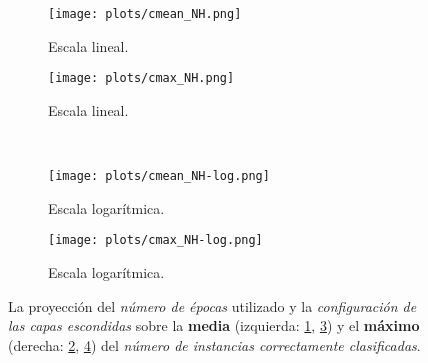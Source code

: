 \begin{figure}[h]
	\centering
	\begin{subfigure}[b]{0.49\textwidth}
        \texttt{[image: plots/cmean\_NH.png]}
        \caption{Escala lineal.}
        \label{fig:cmean_NH-lin}
    \end{subfigure}
	\begin{subfigure}[b]{0.49\textwidth}
        \texttt{[image: plots/cmax\_NH.png]}
        \caption{Escala lineal.}
        \label{fig:cmax_NH-lin}
    \end{subfigure}
    \\
	\begin{subfigure}[b]{0.49\textwidth}
        \texttt{[image: plots/cmean\_NH-log.png]}
        \caption{Escala logarítmica.}
        \label{fig:cmean_NH-log}
    \end{subfigure}
	\begin{subfigure}[b]{0.49\textwidth}
        \texttt{[image: plots/cmax\_NH-log.png]}
        \caption{Escala logarítmica.}
        \label{fig:cmax_NH-log}
    \end{subfigure}    
	
	\caption{La proyección del \emph{número de épocas} utilizado y la
			 \emph{configuración de las capas escondidas} 
			 sobre la \textbf{media} (izquierda: \ref{fig:cmean_NH-lin}, \ref{fig:cmean_NH-log})
			 y el \textbf{máximo} (derecha: \ref{fig:cmax_NH-lin}, \ref{fig:cmax_NH-log})
			 del \emph{número de instancias correctamente clasificadas}.}
	\label{fig:NHc}
\end{figure}

